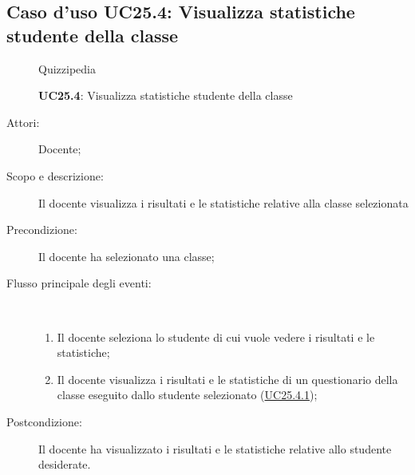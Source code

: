 \subsection{Caso d'uso UC25.4: Visualizza statistiche studente della classe}
\begin{figure}[H]
	\centering
	\begin{resizedtikzpicture}{\textwidth}
		\begin{umlsystem}[x=0, fill=lightgray!20]{Quizzipedia}
		\end{umlsystem}
	\end{resizedtikzpicture}
	\caption{\textbf{UC25.4}: Visualizza statistiche studente della classe}
	\label{UC25.4}
\end{figure}
\begin{description}
	\item[Attori:] Docente;
	\item[Scopo e descrizione:] Il docente visualizza i risultati e le statistiche relative alla classe selezionata
	\item[Precondizione:] Il docente ha selezionato una classe;
	
	\item[Flusso principale degli eventi:] \ 
	\begin{enumerate}
		\item Il docente seleziona lo studente di cui vuole vedere i risultati e le statistiche;
		\item Il docente visualizza i risultati e le statistiche di un questionario della classe eseguito dallo studente selezionato (\hyperlink{UC25.4.1}{UC25.4.1});
		
	\end{enumerate}
	\item[Postcondizione:] Il docente ha visualizzato i risultati e le statistiche relative allo studente desiderate.
\end{description}
\hypertarget{UC25.4.1}{}
